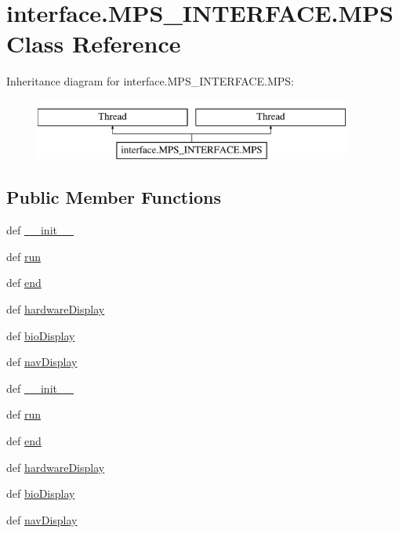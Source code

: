\hypertarget{classinterface_1_1MPS__INTERFACE_1_1MPS}{}\section{interface.\+M\+P\+S\+\_\+\+I\+N\+T\+E\+R\+F\+A\+C\+E.\+M\+P\+S Class Reference}
\label{classinterface_1_1MPS__INTERFACE_1_1MPS}
Inheritance diagram for interface.\+M\+P\+S\+\_\+\+I\+N\+T\+E\+R\+F\+A\+C\+E.\+M\+P\+S\+:\begin{figure}[H]
\begin{center}
\leavevmode
\includegraphics[height=2.000000cm]{classinterface_1_1MPS__INTERFACE_1_1MPS}
\end{center}
\end{figure}
\subsection*{Public Member Functions}
\begin{DoxyCompactItemize}
\item 
def \hyperlink{classinterface_1_1MPS__INTERFACE_1_1MPS_a14e3c3c0348bd54317bf9883cec18bfd}{\+\_\+\+\_\+init\+\_\+\+\_\+}
\item 
def \hyperlink{classinterface_1_1MPS__INTERFACE_1_1MPS_afd3839277bb37e6e365b3bdbce3600b6}{run}
\item 
def \hyperlink{classinterface_1_1MPS__INTERFACE_1_1MPS_ae4d0a8cf4c577cf42c9e1948b5fedee9}{end}
\item 
def \hyperlink{classinterface_1_1MPS__INTERFACE_1_1MPS_af1b0852de8806b27592dab79d44a2916}{hardware\+Display}
\item 
def \hyperlink{classinterface_1_1MPS__INTERFACE_1_1MPS_aab098096679e010e58c2d3b20bd66ca4}{bio\+Display}
\item 
def \hyperlink{classinterface_1_1MPS__INTERFACE_1_1MPS_ad7aa0a5e40c93b9d818730655523db1e}{nav\+Display}
\item 
def \hyperlink{classinterface_1_1MPS__INTERFACE_1_1MPS_a14e3c3c0348bd54317bf9883cec18bfd}{\+\_\+\+\_\+init\+\_\+\+\_\+}
\item 
def \hyperlink{classinterface_1_1MPS__INTERFACE_1_1MPS_afd3839277bb37e6e365b3bdbce3600b6}{run}
\item 
def \hyperlink{classinterface_1_1MPS__INTERFACE_1_1MPS_ae4d0a8cf4c577cf42c9e1948b5fedee9}{end}
\item 
def \hyperlink{classinterface_1_1MPS__INTERFACE_1_1MPS_af1b0852de8806b27592dab79d44a2916}{hardware\+Display}
\item 
def \hyperlink{classinterface_1_1MPS__INTERFACE_1_1MPS_aab098096679e010e58c2d3b20bd66ca4}{bio\+Display}
\item 
def \hyperlink{classinterface_1_1MPS__INTERFACE_1_1MPS_ad7aa0a5e40c93b9d818730655523db1e}{nav\+Display}
\end{DoxyCompactItemize}
